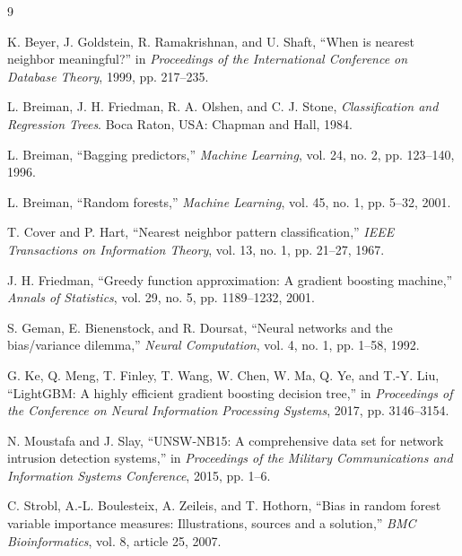\documentclass[conference,10pt]{IEEEtran}
\begin{document}
\begin{thebibliography}{9}

K. Beyer, J. Goldstein, R. Ramakrishnan, and U. Shaft, ``When is nearest neighbor meaningful?'' in \emph{Proceedings of the International Conference on Database Theory}, 1999, pp. 217--235.

L. Breiman, J. H. Friedman, R. A. Olshen, and C. J. Stone, \emph{Classification and Regression Trees}. Boca Raton, USA: Chapman and Hall, 1984.

L. Breiman, ``Bagging predictors,'' \emph{Machine Learning}, vol. 24, no. 2, pp. 123--140, 1996.

L. Breiman, ``Random forests,'' \emph{Machine Learning}, vol. 45, no. 1, pp. 5--32, 2001.

T. Cover and P. Hart, ``Nearest neighbor pattern classification,'' \emph{IEEE Transactions on Information Theory}, vol. 13, no. 1, pp. 21--27, 1967.

J. H. Friedman, ``Greedy function approximation: A gradient boosting machine,'' \emph{Annals of Statistics}, vol. 29, no. 5, pp. 1189--1232, 2001.

S. Geman, E. Bienenstock, and R. Doursat, ``Neural networks and the bias/variance dilemma,'' \emph{Neural Computation}, vol. 4, no. 1, pp. 1--58, 1992.

G. Ke, Q. Meng, T. Finley, T. Wang, W. Chen, W. Ma, Q. Ye, and T.-Y. Liu, ``LightGBM: A highly efficient gradient boosting decision tree,'' in \emph{Proceedings of the Conference on Neural Information Processing Systems}, 2017, pp. 3146--3154.

N. Moustafa and J. Slay, ``UNSW-NB15: A comprehensive data set for network intrusion detection systems,'' in \emph{Proceedings of the Military Communications and Information Systems Conference}, 2015, pp. 1--6.

C. Strobl, A.-L. Boulesteix, A. Zeileis, and T. Hothorn, ``Bias in random forest variable importance measures: Illustrations, sources and a solution,'' \emph{BMC Bioinformatics}, vol. 8, article 25, 2007.

\end{thebibliography}
\end{document}

